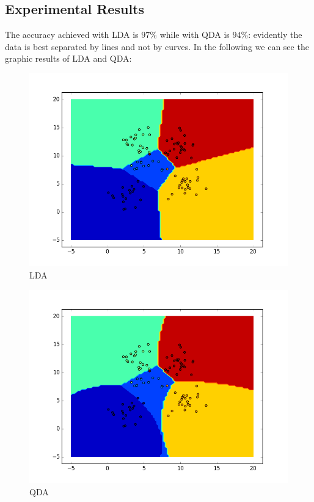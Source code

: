 \documentclass{article}
\begin{document}
\subsection{Experimental Results}
The accuracy achieved with LDA is $97\%$ while with QDA is $94\%$: evidently the data is best separated by lines and not by curves.
In the following we can see the graphic results of LDA and QDA:
\begin{figure}[h]
  \includegraphics[width=\textwidth]{lda.png}
  \caption{LDA}
\end{figure}
\begin{figure}[h]
  \includegraphics[width=\textwidth]{qda.png}
  \caption{QDA}
\end{figure}


\end{document}

